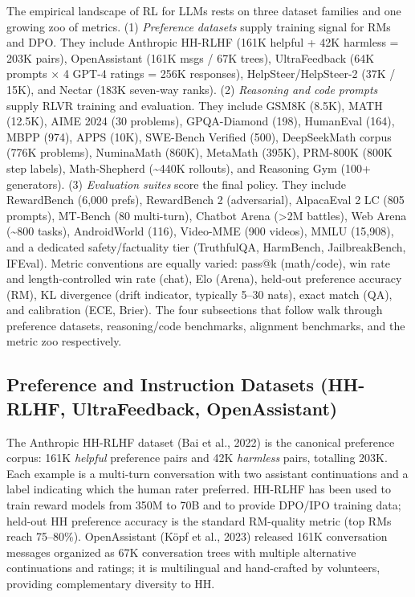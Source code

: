 The empirical landscape of RL for LLMs rests on three dataset families and one growing zoo of metrics. (1) \emph{Preference datasets} supply training signal for RMs and DPO. They include Anthropic HH-RLHF (161K helpful + 42K harmless = 203K pairs), OpenAssistant (161K msgs / 67K trees), UltraFeedback (64K prompts × 4 GPT-4 ratings = 256K responses), HelpSteer/HelpSteer-2 (37K / 15K), and Nectar (183K seven-way ranks). (2) \emph{Reasoning and code prompts} supply RLVR training and evaluation. They include GSM8K (8.5K), MATH (12.5K), AIME 2024 (30 problems), GPQA-Diamond (198), HumanEval (164), MBPP (974), APPS (10K), SWE-Bench Verified (500), DeepSeekMath corpus (776K problems), NuminaMath (860K), MetaMath (395K), PRM-800K (800K step labels), Math-Shepherd (\textasciitilde440K rollouts), and Reasoning Gym (100+ generators). (3) \emph{Evaluation suites} score the final policy. They include RewardBench (6,000 prefs), RewardBench 2 (adversarial), AlpacaEval 2 LC (805 prompts), MT-Bench (80 multi-turn), Chatbot Arena (\textgreater2M battles), Web Arena (\textasciitilde800 tasks), AndroidWorld (116), Video-MME (900 videos), MMLU (15,908), and a dedicated safety/factuality tier (TruthfulQA, HarmBench, JailbreakBench, IFEval). Metric conventions are equally varied: pass@k (math/code), win rate and length-controlled win rate (chat), Elo (Arena), held-out preference accuracy (RM), KL divergence (drift indicator, typically 5--30 nats), exact match (QA), and calibration (ECE, Brier). The four subsections that follow walk through preference datasets, reasoning/code benchmarks, alignment benchmarks, and the metric zoo respectively.

\subsection{Preference and Instruction Datasets (HH-RLHF, UltraFeedback, OpenAssistant)}\label{preference-and-instruction-datasets-hh-rlhf-ultrafeedback-openassistant}

The Anthropic HH-RLHF dataset (Bai et al., 2022) is the canonical preference corpus: 161K \emph{helpful} preference pairs and 42K \emph{harmless} pairs, totalling 203K. Each example is a multi-turn conversation with two assistant continuations and a label indicating which the human rater preferred. HH-RLHF has been used to train reward models from 350M to 70B and to provide DPO/IPO training data; held-out HH preference accuracy is the standard RM-quality metric (top RMs reach 75--80\%). OpenAssistant (Köpf et al., 2023) released 161K conversation messages organized as 67K conversation trees with multiple alternative continuations and ratings; it is multilingual and hand-crafted by volunteers, providing complementary diversity to HH.

